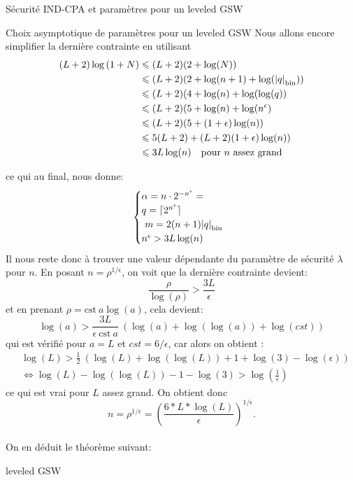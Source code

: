 \begin{section}{Sécurité IND-CPA et paramètres pour un leveled GSW}
\begin{subsection}{Choix asymptotique de paramètres pour un leveled GSW}
Nous allons encore simplifier la dernière contrainte en utilisant
\begin{align*} (L+2) \log\left( 1 + N\right) &\leqslant (L+2) (2 + \log(N)) \\
&\leqslant (L+2) (2 + \log(n+1) +  \log({|q|}_{\text{bin}})) \\
&\leqslant (L+2) (4 + \log(n) + \log(\log(q)) \\
&\leqslant (L+2) (5 + \log(n) + \log(n^\epsilon) \\
&\leqslant (L+2) (5 + (1+\epsilon)\log(n)) \\
&\leqslant 5(L+2) + (L+2)(1+\epsilon)\log(n)) \\
&\leqslant 3 L \log(n) \quad \text{pour $n$ assez grand}
\end{align*}

ce qui au final, nous donne:
\[ \begin{cases}
	\alpha  = n \cdot 2^{-n^\epsilon}=  \\
	q = \lceil 2^{n^\epsilon} \rceil\\ 
	m = 2(n+1)\bnorm{q} \\  
	n^\epsilon > 3 L \log(n)
	\end{cases}  \]
Il nous reste donc à trouver une valeur dépendante du paramètre de sécurité $\lambda$ pour $n$.  En posant $n = \rho^{1/\epsilon}$, on voit que la dernière contrainte devient:
\[ \frac{\rho}{\log(\rho)} > \frac{3 L}{\epsilon}  \]
et en prenant $\rho = \text{cst}\: a \log(a)$, cela devient:
\[\log(a)> \frac{3 L}{\epsilon\:\text{cst}\: a}\:(\log(a) + \log(\log(a)) + \log(cst))   \]
qui est vérifié pour $a = L$ et $cst = 6/\epsilon$, car alors on obtient :
\begin{align*}
& \log(L)> \frac{1}{2}\:(\log(L) + \log(\log(L)) + 1 + \log(3) - \log(\epsilon)) \\
&\Leftrightarrow  \log(L) - \log(\log(L)) - 1 - \log(3) > \log(\frac{1}{\epsilon})
\end{align*}
ce qui est vrai pour $L$ assez grand.  
On obtient donc 
\[n = \rho^{1 / \epsilon}  = {\left(\frac{6 * L * \log(L)}{\epsilon}\right)}^{1 / \epsilon}.\]

\paragraph{}
On en déduit le théorème suivant:
\begin{thm}{leveled GSW}


\end{thm}
\end{subsection}
\end{section}
